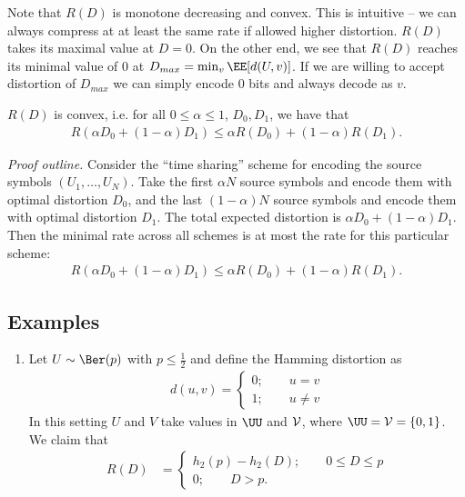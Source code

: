 \begin{definition}
Note that $R(D)$ is monotone decreasing and convex.  This is intuitive -- we can always compress at at least the same rate if allowed higher distortion.  $R(D)$ takes its maximal value at $D = 0$.  On the other end, we see that $R(D)$ reaches its minimal value of 0 at $D_{max} = \min_v \EE[d(U,v)]$.  If we are willing to accept distortion of $D_{max}$ we can simply encode 0 bits and always decode as $v$.  

\begin{claim}
  $R(D)$ is convex, i.e. for all $0 \leq \alpha \leq 1$, $D_0, D_1$, we have that
  \begin{align*}
    R(\alpha D_0 + (1 - \alpha) D_1) \leq \alpha R (D_0) + (1 - \alpha) R(D_1).
  \end{align*}
\end{claim}

{\it Proof outline.}  Consider the ``time sharing'' scheme for encoding the source symbols $(U_1, \dots, U_N)$.  Take the first $\alpha N$ source symbols and encode them with optimal distortion $D_0$, and the last $(1 - \alpha) N$ source symbols and encode them with optimal distortion $D_1$.  The total expected distortion is $\alpha  D_0 + (1 - \alpha)  D_1$.  Then the minimal rate across all schemes is at most the rate for this particular scheme:
\begin{align*}
  R(\alpha D_0 + (1 - \alpha)D_1) \leq \alpha R(D_0) + (1 - \alpha) R(D_1).
\end{align*}

\subsection{Examples}

\begin{enumerate}
  \item Let $U \sim \Ber(p)$ with $p \leq \frac{1}{2}$ and define the Hamming distortion as
    \begin{align*}
      d(u, v) = 
      \begin{cases}
        0; \qquad u = v \\
        1; \qquad u \neq v
      \end{cases}
    \end{align*}
    In this setting $U$ and $V$ take values in $\UU$ and $\mathcal{V}$, where $\UU = \VV = \left\{ 0, 1 \right\}$. We claim that
    \begin{align*}
      R(D) &=
      \begin{cases}
        h_2(p) - h_2(D); \qquad 0 \leq D \leq p \\
        0; \qquad D > p.
      \end{cases}
    \end{align*}


\end{enumerate}
\end{definition}
